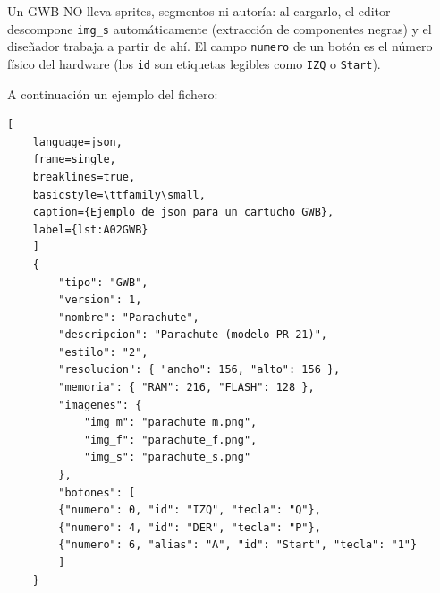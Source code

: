 Un GWB NO lleva sprites, segmentos ni autoría: al cargarlo, el editor
descompone \texttt{img\_s} automáticamente (extracción de componentes
negras) y el diseñador trabaja a partir de ahí. El campo \texttt{numero} de un botón es el número físico del hardware (los
\texttt{id} son etiquetas legibles como \texttt{IZQ} o \texttt{Start}).

A continuación un ejemplo del fichero:

\begin{lstlisting}[
	language=json, 
	frame=single, 
	breaklines=true, 
	basicstyle=\ttfamily\small,
	caption={Ejemplo de json para un cartucho GWB},
	label={lst:A02GWB}
	]
	{
		"tipo": "GWB",
		"version": 1,
		"nombre": "Parachute",
		"descripcion": "Parachute (modelo PR-21)",
		"estilo": "2",
		"resolucion": { "ancho": 156, "alto": 156 },
		"memoria": { "RAM": 216, "FLASH": 128 },
		"imagenes": {
			"img_m": "parachute_m.png",
			"img_f": "parachute_f.png",
			"img_s": "parachute_s.png"
		},
		"botones": [
		{"numero": 0, "id": "IZQ", "tecla": "Q"},
		{"numero": 4, "id": "DER", "tecla": "P"},
		{"numero": 6, "alias": "A", "id": "Start", "tecla": "1"}
		]
	}
\end{lstlisting}
